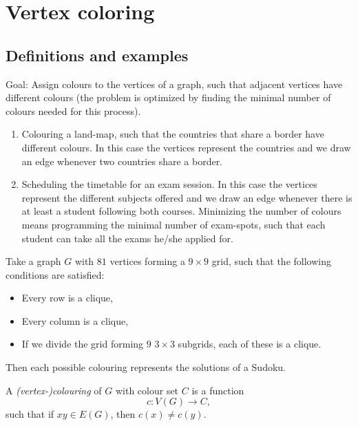 \chapter{Vertex coloring}

\section{Definitions and examples}

Goal: Assign colours to the vertices of a graph, such that adjacent vertices have different colours (the problem is optimized by finding the minimal number of colours needed for this process).

\begin{example}
\begin{enumerate}
\item Colouring a land-map, such that the countries that share a border have different colours. In this case the vertices represent the countries and we draw an edge whenever two countries share a border.
\item Scheduling the timetable for an exam session. In this case the vertices represent the different subjects offered and we draw an edge whenever there is at least a student following both courses. Minimizing the number of colours means programming the minimal number of exam-spots, such that each student can take all the exams he/she applied for.
\end{enumerate}
\end{example}

\begin{example} Take a graph $G$ with $81$ vertices forming a $9\times9$ grid, such that the following conditions are satisfied:
\begin{itemize}
\item Every row is a clique,
\item Every column is a clique,
\item If we divide the grid forming $9$ $3\times 3$ subgrids, each of these is a clique.
\end{itemize}
Then each possible colouring represents the solutions of a Sudoku.
\end{example}

\begin{definition} A \emph{(vertex-)colouring} of $G$ with colour set $C$ is a function
$$c:V(G)\longrightarrow C,$$
such that if $xy\in E(G)$, then $c(x)\neq c(y)$.
\end{definition}

